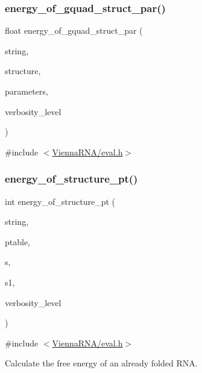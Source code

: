 \subsubsection{\texorpdfstring{energy\+\_\+of\+\_\+gquad\+\_\+struct\+\_\+par()}{energy\_of\_gquad\_struct\_par()}}
{\footnotesize\ttfamily float energy\+\_\+of\+\_\+gquad\+\_\+struct\+\_\+par (\begin{DoxyParamCaption}\item[{const char $\ast$}]{string,  }\item[{const char $\ast$}]{structure,  }\item[{\mbox{\hyperlink{group__energy__parameters_ga8a69ca7d787e4fd6079914f5343a1f35}{vrna\+\_\+param\+\_\+t}} $\ast$}]{parameters,  }\item[{int}]{verbosity\+\_\+level }\end{DoxyParamCaption})}



{\ttfamily \#include $<$\mbox{\hyperlink{eval_8h}{Vienna\+R\+N\+A/eval.\+h}}$>$}

\mbox{\label{group__eval_ga8831445966b761417e713360791299d8}} 
\subsubsection{\texorpdfstring{energy\+\_\+of\+\_\+structure\+\_\+pt()}{energy\_of\_structure\_pt()}}
{\footnotesize\ttfamily int energy\+\_\+of\+\_\+structure\+\_\+pt (\begin{DoxyParamCaption}\item[{const char $\ast$}]{string,  }\item[{short $\ast$}]{ptable,  }\item[{short $\ast$}]{s,  }\item[{short $\ast$}]{s1,  }\item[{int}]{verbosity\+\_\+level }\end{DoxyParamCaption})}



{\ttfamily \#include $<$\mbox{\hyperlink{eval_8h}{Vienna\+R\+N\+A/eval.\+h}}$>$}



Calculate the free energy of an already folded R\+NA. 

